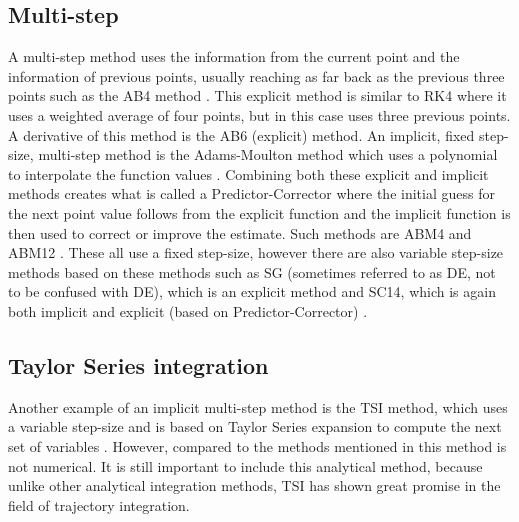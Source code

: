 \subsection{Multi-step}
\label{subsec:multi}
A multi-step method uses the information from the current point and the information of previous points, usually reaching as far back as the previous three points such as the \ac{AB4} method \cite{noomen2013int}. This explicit method is similar to \ac{RK4} where it uses a weighted average of four points, but in this case uses three previous points. A derivative of this method is the \ac{AB6} (explicit) method. An implicit, fixed step-size, multi-step method is the Adams-Moulton method which uses a polynomial to interpolate the function values \cite{noomen2013int}. Combining both these explicit and implicit methods creates what is called a Predictor-Corrector where the initial guess for the next point value follows from the explicit function and the implicit function is then used to correct or improve the estimate. Such methods are \ac{ABM4} and \ac{ABM12} \cite{noomen2013int,montenbruck1992}. These all use a fixed step-size, however there are also variable step-size methods based on these methods such as \ac{SG} (sometimes referred to as DE, not to be confused with \acl{DE}), which is an explicit method \cite{berry2004,meijaard1991} and \ac{SC14}, which is again both implicit and explicit (based on Predictor-Corrector) \cite{berry2004,ramos2005}.





\subsection{Taylor Series integration}
\label{subsec:ana_tsi}
Another example of an implicit multi-step method is the \acf{TSI} method, which uses a variable step-size and is based on Taylor Series expansion to compute the next set of variables \cite{scott2008high}. However, compared to the methods mentioned in  this method is not numerical. It is still important to include this analytical method, because unlike other analytical integration methods, \ac{TSI} has shown great promise in the field of trajectory integration.


